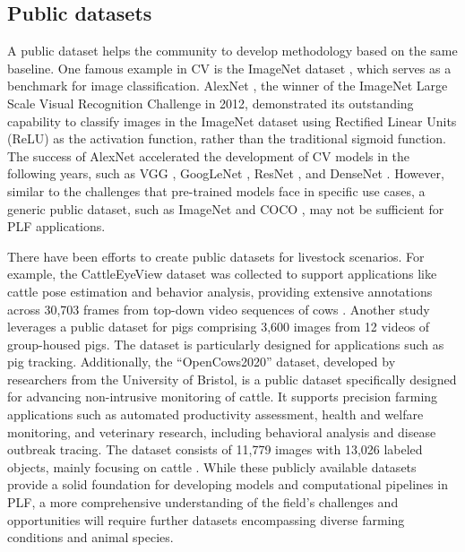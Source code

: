 \subsection*{Public datasets}

A public dataset helps the community to develop methodology based on the same baseline. One famous example in CV is the ImageNet dataset \cite{deng2009imagenet}, which serves as a benchmark for image classification. AlexNet \cite{krizhevsky2017imagenet}, the winner of the ImageNet Large Scale Visual Recognition Challenge in 2012, demonstrated its outstanding capability to classify images in the ImageNet dataset using Rectified Linear Units (ReLU) as the activation function, rather than the traditional sigmoid function. The success of AlexNet accelerated the development of CV models in the following years, such as VGG \cite{karen2014very}, GoogLeNet \cite{szegedy2015going}, ResNet \cite{targ2016resnet}, and DenseNet \cite{huang2017densely}. However, similar to the challenges that pre-trained models face in specific use cases, a generic public dataset, such as ImageNet \cite{deng2009imagenet} and COCO \cite{lin2014microsoft}, may not be sufficient for PLF applications.

There have been efforts to create public datasets for livestock scenarios. For example, the CattleEyeView dataset was collected to support applications like cattle pose estimation and behavior analysis, providing extensive annotations across 30,703 frames from top-down video sequences of cows \cite{ong2023cattleeyeview}. Another study \cite{t2020long} leverages a public dataset for pigs comprising 3,600 images from 12 videos of group-housed pigs. The dataset is particularly designed for applications such as pig tracking. Additionally, the ``OpenCows2020'' dataset, developed by researchers from the University of Bristol, is a public dataset specifically designed for advancing non-intrusive monitoring of cattle. It supports precision farming applications such as automated productivity assessment, health and welfare monitoring, and veterinary research, including behavioral analysis and disease outbreak tracing. The dataset consists of 11,779 images with 13,026 labeled objects, mainly focusing on cattle \cite{visualization-tools-for-opencows2020-dataset}. While these publicly available datasets provide a solid foundation for developing models and computational pipelines in PLF, a more comprehensive understanding of the field's challenges and opportunities will require further datasets encompassing diverse farming conditions and animal species.